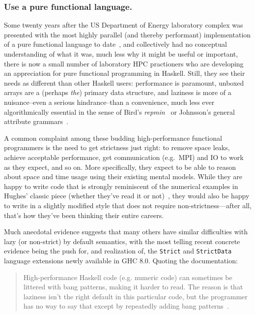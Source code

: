 \documentclass{llncs}
\begin{document}
\subsubsection{Use a pure functional language.}
Some twenty years after the US Department of Energy laboratory complex was
presented with the most highly parallel (and thereby performant)
implementation of a pure functional language to date~\cite{Davis96}, and
collectively had no conceptual understanding of what it was, much less why it
might be useful or important, there is now a small number of laboratory HPC
practioners who are developing an appreciation for pure functional programming
in Haskell.  Still, they see their needs as different than other Haskell
users: performance is paramount, unboxed arrays are a (perhaps \emph{the})
primary data structure, and laziness is more of a nuisance--even a serious
hindrance--than a convenience, much less ever algorithmically essential in the
sense of Bird's \emph{repmin}~\cite{Bird84} or Johnsson's general attribute
grammars~\cite{Johnsson87}.

A common complaint among these budding high-performance functional programmers
is the need to get strictness just right: to remove space leaks, achieve
acceptable performance, get communication (e.g.\ MPI) and IO to work as they
expect, and so on.  More specifically, they expect to be able to reason about
space and time usage using their existing mental models. While they are happy
to write code that is strongly reminiscent of the numerical examples in
Hughes' classic piece (whether they've read it or not)~\cite{Hughes89}, they
would also be happy to write in a slightly modified style that does not
require non-strictness---after all, that's how they've been thinking their
entire careers.

Much anecdotal evidence suggests that many others have similar difficulties
with lazy (or non-strict) by default semantics, with the most telling recent
concrete evidence being the push for, and realization of, the \texttt{Strict}
and \texttt{StrictData} language extensions newly available in GHC 8.0.
Quoting the documentation:
\begin{quote}
High-performance Haskell code (e.g. numeric code) can sometimes be littered
with bang patterns, making it harder to read. The reason is that laziness
isn't the right default in this particular code, but the programmer has no way
to say that except by repeatedly adding bang patterns~\cite{strict-strictdata}.
\end{quote}
\end{document}
